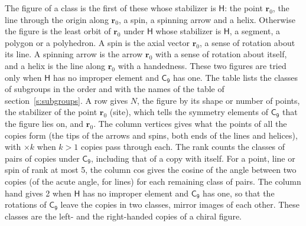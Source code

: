 \documentclass[10pt,a4paper]{article}
\numberwithin{equation}{section}
\newcommand{\grp}[1]{\mathsf{#1}}
\newcommand{\pointr}{\mathbf{r}}
\begin{document}
\leavevmode\label{n:head.figure}The figure of a class is the first of these whose stabilizer is $\grp{H}$: the point $\pointr_0$, the line through the origin along $\pointr_0$, a spin, a spinning arrow and a helix. Otherwise the figure is the least orbit of $\pointr_0$ under $\grp{H}$ whose stabilizer is $\grp{H}$, a segment, a polygon or a polyhedron. A spin is the axial vector $\pointr_0$, a sense of rotation about its line. A spinning arrow is the arrow $\pointr_0$ with a sense of rotation about itself, and a helix is the line along $\pointr_0$ with a handedness. These two figures are tried only when $\grp{H}$ has no improper element and $\grp{C_{9}}$ has one. The table lists the classes of subgroups in the order and with the names of the table of section~\ref{s:subgroups}. \label{n:head.site}A row gives $N$, the figure by its shape or number of points, the stabilizer of the point $\pointr_0$ (site), which tells the symmetry elements of $\grp{C_{9}}$ that the figure lies on, and $\pointr_0$. \label{n:head.vertices}The column vertices gives what the points of all the copies form (the tips of the arrows and spins, both ends of the lines and helices), with ${\times}k$ when $k > 1$ copies pass through each. \label{n:head.rank}The rank counts the classes of pairs of copies under $\grp{C_{9}}$, including that of a copy with itself. \label{n:head.cos}For a point, line or spin of rank at most 5, the column cos gives the cosine of the angle between two copies (of the acute angle, for lines) for each remaining class of pairs. \label{n:head.hand}The column hand gives 2 when $\grp{H}$ has no improper element and $\grp{C_{9}}$ has one, so that the rotations of $\grp{C_{9}}$ leave the copies in two classes, mirror images of each other. These classes are the left- and the right-handed copies of a chiral figure.
\end{document}
